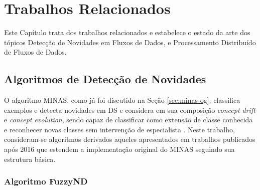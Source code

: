 \chapter{Trabalhos Relacionados}\label{cha:related}




\begin{resumocap}

Este Capítulo trata dos trabalhos relacionados e estabelece o estado da arte
dos tópicos Detecção de Novidades em Fluxos de Dados, e 
Processamento Distribuído de Fluxos de Dados.

\end{resumocap}


\section{Algoritmos de Detecção de Novidades}

\newcommand{\cluster}{\emph{cluster}\xspace}
\newcommand{\clusters}{\emph{clusters}\xspace}
\newcommand{\dataset}{\emph{data set}\xspace}
\newcommand{\datasets}{\emph{data sets}\xspace}

O algoritmo MINAS, como já foi discutido na Seção \ref{sec:minas-og}, classifica exemplos e detecta
novidades em DS e considera em sua composição \emph{concept drift} e
\emph{concept evolution}, sendo capaz de classificar como extensão de classe
conhecida e reconhecer novas classes sem intervenção de especialista
\cite{Faria2016minas}. Neste trabalho, consideram-se algoritmos derivados
aqueles apresentados em trabalhos publicados após 2016 que estendem a
implementação original do MINAS seguindo sua estrutura básica.

\subsection{Algoritmo FuzzyND}

